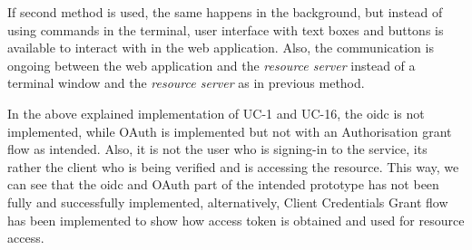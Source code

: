 If second method is used, the same happens in the background, but instead of using commands in the terminal, user interface with text boxes and buttons is available to interact with in the web application. Also, the communication is ongoing between the web application and the \textit{resource server} instead of a terminal window and the \textit{resource server} as in previous method.

\bigskip \noindent
In the above explained implementation of UC-1 and UC-16, the \acrshort{oidc} is not implemented, while OAuth is implemented but not with an Authorisation grant flow as intended. Also, it is not the user who is signing-in to the service, its rather the client who is being verified and is accessing the resource. This way, we can see that the \acrshort{oidc} and OAuth part of the intended prototype has not been fully and successfully implemented, alternatively, Client Credentials Grant flow has been implemented to show how access token is obtained and used for resource access.





